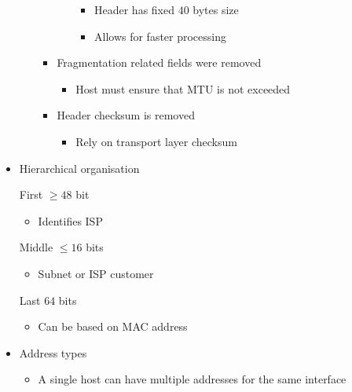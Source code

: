 \begin{itemize}
\begin{itemize}
\begin{itemize}
\begin{itemize}
                                \begin{itemize}
                                    \item Header has fixed $40$ bytes size
                                    \item Allows for faster processing
                                \end{itemize}
                        \end{itemize}
                    \item Fragmentation related fields were removed
                        \begin{itemize}
                            \item Host must ensure that MTU is not exceeded
                        \end{itemize}
                    \item Header checksum is removed
                        \begin{itemize}
                            \item Rely on transport layer checksum
                        \end{itemize}
                \end{itemize}
        \end{itemize}
    \item Hierarchical organisation
        \begin{itemize}
             First $\ge 48$ bit
                \begin{itemize}
                    \item Identifies ISP
                \end{itemize}
             Middle $\le 16$ bits
                \begin{itemize}
                    \item Subnet or ISP customer
                \end{itemize}
             Last $64$ bits
                \begin{itemize}
                    \item Can be based on MAC address
                \end{itemize}
        \end{itemize}
    \item Address types
        \begin{itemize}
            \item A single host can have multiple addresses for the same interface 

\end{itemize}
\end{itemize}
